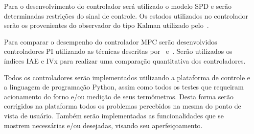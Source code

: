 Para o desenvolvimento do controlador será utilizado o modelo SPD e serão
determinadas restrições do sinal de controle. Os estados utilizados no
controlador serão os provenientes do observador do tipo Kalman utilizado
pelo~\textcite{masterthesis:nelson}.

Para comparar o desempenho do controlador MPC serão desenvolvidos controladores
PI utilizando as técnicas descritas por~\textcite{article:clarke}
e~\textcite{article:martins}. Serão utilizados os índices IAE e IVx para
realizar uma comparação quantitativa dos controladores.

Todos os controladores serão implementados utilizando a plataforma de controle e
a linguagem de programação Python, assim como todos os testes que requeiram
acionamento do forno e/ou medição de seus termômetros. Desta forma serão
corrigidos na plataforma todos os problemas percebidos na mesma do ponto de
vista de usuário. Também serão implementadas as funcionalidades que se mostrem
necessárias e/ou desejadas, visando seu aperfeiçoamento.
